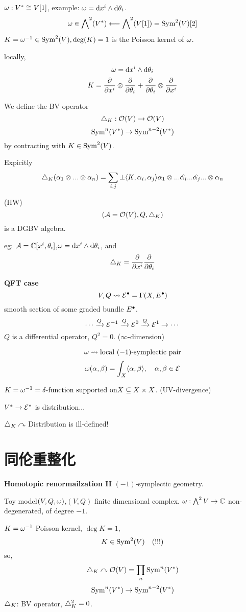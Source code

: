 $\omega:V^*\cong V[1]$, example:
$\omega=\mathrm{d} x^i\wedge\mathrm{d}\theta_i$.
$$\omega\in\bigwedge\nolimits^{2}(V^*)\longleftarrow \bigwedge\nolimits^{2}(V[1])=\operatorname{Sym}^2(V)[2]$$
$K=\omega^{-1}\in\operatorname{Sym}^2(V),\deg(K)=1$ is the Poisson kernel of $\omega$.

locally,
$$\omega=\mathrm{d} x^i\wedge\mathrm{d}\theta_i$$
$$K=\frac{\partial } {\partial x^i}\otimes\frac{\partial } {\partial \theta_i}+\frac{\partial } {\partial \theta_i}\otimes\frac{\partial } {\partial x^i}$$

We define the BV operator
$$\triangle_K:\mathcal{O}(V)\to\mathcal{O}(V)$$
$$\operatorname{Sym}^n(V^*)\to\operatorname{Sym}^{n-2}(V^*)$$
by contracting with $K\in\operatorname{Sym}^2(V)$.

Expicitly
$$\triangle_K(\alpha_1\otimes...\otimes\alpha_n)
=\sum_{i,j}\pm\langle K,\alpha_i,\alpha_j\rangle\alpha_1\otimes...\hat{\alpha_i}...\hat{\alpha_j}...\otimes\alpha_n$$

\begin{prop}(HW)
$$(\mathcal{A}=\mathcal{O}(V),Q,\triangle_K)$$
is a DGBV algebra.
\end{prop}

eg: $\mathcal{A}=\mathbb{C}[x^i,\theta_i]$,$\omega=\mathrm{d} x^i\wedge\mathrm{d}\theta_i$, and
$$\triangle_K=\frac{\partial } {\partial x^i}\frac{\partial } {\partial \theta_i}$$

\textbf{QFT case}
$$V,Q\rightsquigarrow
\mathcal{E}^{\bullet}=\Gamma(X,E^{\bullet})$$
smooth section of some graded bundle $E^{\bullet}$.
$$\cdots\xrightarrow{Q}\mathcal{E}^{-1}\xrightarrow{Q}\mathcal{E}^0\xrightarrow{Q}\mathcal{E}^1\to\cdots$$
$Q$ is a differential operator, $Q^2=0$. ($\infty$-dimension)

$$\omega\rightsquigarrow\text{local $(-1)$-symplectic pair}$$
$$\omega(\alpha,\beta)=\int_X\langle\alpha,\beta\rangle,\quad\alpha,\beta\in\mathcal{E}$$

$K=\omega^{-1}=\delta\text{-function supported on} X\subseteq X\times X$.
(UV-divergence)

$V^*\to\mathcal{E}^*$ is distribution...

$\triangle_K\curvearrowright$ Distribution is ill-defined!


\section{同伦重整化}
\textbf{Homotopic renormailzation II}
$(-1)$-symplectic geometry.

Toy model$(V,Q,\omega)$,$(V,Q)$ finite dimensional complex.
$\omega:\bigwedge\nolimits^{2}V\to\mathbb{C}$
non-degenerated, of degree $-1$.

$K=\omega^{-1}$ Poisson kernel, $\deg K=1$,
$$K\in\operatorname{Sym}^2(V)\quad (!!!)$$
so,
$$\triangle_K\curvearrowright\mathcal{O}(V)=\prod_{n}\operatorname{Sym}^n(V^*)$$
$$\operatorname{Sym}^n(V^*)\to\operatorname{Sym}^{n-2}(V^*)$$
$\triangle_K$: BV operator, $\triangle_K^2=0$.

